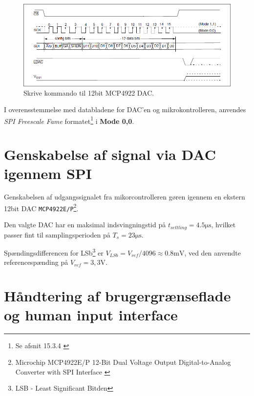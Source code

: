 \begin{figure}[h!]
	\centering
	\includegraphics[width=.8\textwidth]{billeder/dac12bit_writecmd.png}
	\caption{Skrive kommando til 12bit MCP4922 DAC.\cite[s. 25]{mcp4922}}
	\label{fig:dac12bit_writecmd}
\end{figure}

I overensstemmelse med databladene for DAC'en og mikrokontrolleren, anvendes \emph{SPI Freescale Fame} formatet\footnote{Se afsnit 15.3.4 \cite[s. 954]{tm4c123gh6pm}} i \textbf{Mode 0,0}.


\section{Genskabelse af signal via DAC igennem SPI}
Genskabelsen af udgangssignalet fra mikorcontrolleren gøren igennem en ekstern 12bit DAC \texttt{MCP4922E/P}\footnote{Microchip MCP4922E/P 12-Bit Dual Voltage Output Digital-to-Analog Converter with SPI Interface \cite{mcp4922} }.

Den valgte DAC har en maksimal indsvingningstid på $t_{settling} = \num{4.5}\si{\micro\second}$, hvilket passer fint til samplingsperioden på $T_s = 23\si{\micro\second}$.

Spændingsdifferencen for LSb\footnote{LSB - Least Significant Bitden} er $ V_{LSb} = V_{ref} / 4096 \approx \num{0,8}\si{\milli\volt} $, ved den anvendte referencespænding på $V_{ref} = 3,3\si{\volt}$.

 

\section{Håndtering af brugergrænseflade og human input interface}


